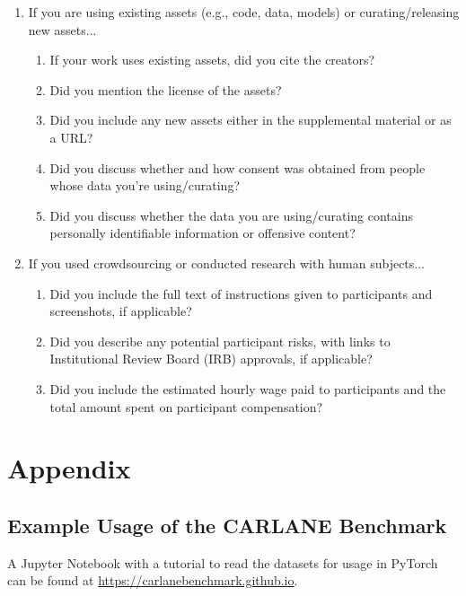 \documentclass{article}
\begin{document}
\begin{enumerate}
		\item If you are using existing assets (e.g., code, data, models) or curating/releasing new assets...
		\begin{enumerate}
			\item If your work uses existing assets, did you cite the creators?
			\item Did you mention the license of the assets?
			\item Did you include any new assets either in the supplemental material or as a URL?
			\answerYes{}
			\item Did you discuss whether and how consent was obtained from people whose data you're using/curating?
			\item Did you discuss whether the data you are using/curating contains personally identifiable information or offensive content?
		\end{enumerate}
		
		\item If you used crowdsourcing or conducted research with human subjects...
		\begin{enumerate}
			\item Did you include the full text of instructions given to participants and screenshots, if applicable?
			\answerNA{}
			\item Did you describe any potential participant risks, with links to Institutional Review Board (IRB) approvals, if applicable?
			\answerNA{}
			\item Did you include the estimated hourly wage paid to participants and the total amount spent on participant compensation?
			\answerNA{}
		\end{enumerate}
		
	\end{enumerate}
	

\newpage
	\appendix
	
	\section{Appendix}
	
\subsection{Example Usage of the CARLANE Benchmark}
A Jupyter Notebook with a tutorial to read the datasets for usage in PyTorch can be found at \href{https://carlanebenchmark.github.io}{https://carlanebenchmark.github.io}. 
\end{document}
